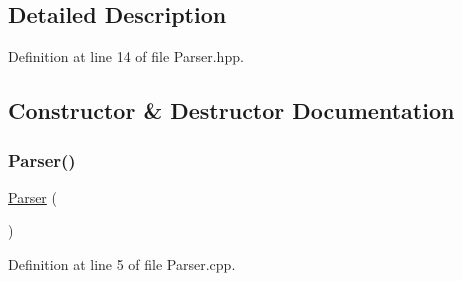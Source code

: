 \subsection{Detailed Description}


Definition at line 14 of file Parser.\+hpp.



\subsection{Constructor \& Destructor Documentation}
\mbox{\label{classft_1_1_parser_a6bfb42ee628e026bebda9adb7ae8b895}} 
\subsubsection{\texorpdfstring{Parser()}{Parser()}}
{\footnotesize\ttfamily \hyperlink{classft_1_1_parser}{Parser} (\begin{DoxyParamCaption}{ }\end{DoxyParamCaption})}



Definition at line 5 of file Parser.\+cpp.


